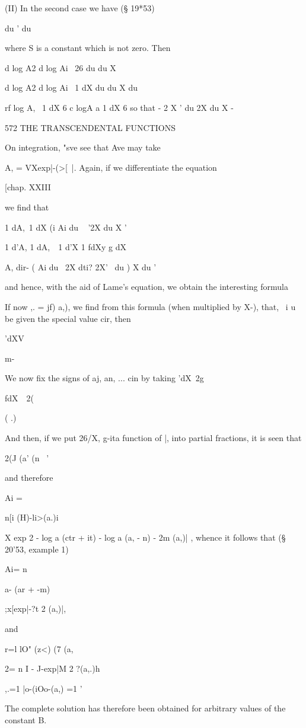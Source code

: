 {{{{{{{{(II) In the second case we have (§ 19*53)

du ' du

where S is a constant which is not zero. Then

d log A2 d log Ai \ 26 du du X

d log A2 d log Ai \ 1 dX du du X du

rf log A, \ 1 dX 6 c logA a 1 dX 6 so that - 2 X ' du 2X du X -

572 THE TRANSCENDENTAL FUNCTIONS

On integration, "sve see that Ave may take

A, = VXexp|-(>[~|. Again, if we differentiate the equation

[chap. XXIII

we find that

1 dA,\ 1 dX (i Ai du ~ '2X du X '

1 d'A, 1 dA,\ \ 1 d'X 1 fdXy g dX

A, dir- ( Ai du \ 2X dti? 2X' \ du ) X du '

and hence, with the aid of Lame's equation, we obtain the interesting
formula

If now ,. = jf) a,), we find from this formula (when multiplied by
X-), that, \ i u be given the special value cir, then

'dXV

m-

We now fix the signs of aj, an, ... cin by taking 'dX\ 2g

fdX\ \ 2(

( .)

And then, if we put 26/X, g-ita function of |, into partial fractions,
it is seen that

2(J (a' (n \ '

and therefore

Ai =

n[i (H)-li>(a.)i

X exp 2 - log a (ctr + it) - log a (a, - n) - 2m (a,)| , whence it
follows that (§ 20'53, example 1)

Ai= n

a- (ar + -m)

;x[exp|-?t 2 (a,)|,

and

r=l lO" (z<) (7 (a,

 2= n I - J-exp|M 2 ?(a,.)h

,.=1 |o-(iOo-(a,) =1 '

The complete solution has therefore been obtained for arbitrary values
of the constant B.

}}}}}}}}
